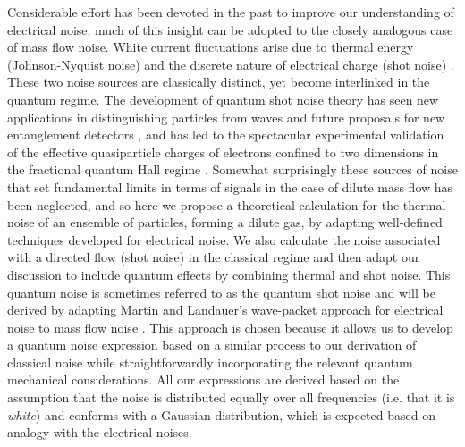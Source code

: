 \documentclass[%
 reprint,
 aps,
 prb,
 epsf,
]{revtex4-2}
\begin{document}
Considerable effort has been devoted in the past to improve our understanding of electrical noise; much of this insight can be adopted to the closely analogous case of mass flow noise.  White current fluctuations arise due to thermal energy (Johnson-Nyquist noise) and the discrete nature of electrical charge (shot noise) \cite{wavepacket}. These two noise sources are classically distinct, yet become interlinked in the quantum regime. The development of quantum shot noise theory has seen new applications in distinguishing particles from waves and future proposals for new entanglement detectors \cite{entanglement}, and has led to the spectacular experimental validation of the effective quasiparticle charges of electrons confined to two dimensions in the fractional quantum Hall regime \cite{quasiparticle,heiblum}. Somewhat surprisingly these sources of noise that set fundamental limits in terms of signals in the case of dilute mass flow has been neglected, and so here we propose a theoretical calculation for the thermal noise of an ensemble of particles, forming a dilute gas, by adapting well-defined techniques developed for electrical noise. We also calculate the noise associated with a directed flow (shot noise) in the classical regime and then adapt our discussion to include quantum effects by combining thermal and shot noise. This quantum noise is sometimes referred to as the quantum shot noise and will be derived by adapting Martin and Landauer's wave-packet approach for electrical noise to mass flow noise \cite{wavepacket}. This approach is chosen because it allows us to develop a quantum noise expression based on a similar process to our derivation of classical noise while straightforwardly incorporating the relevant quantum mechanical considerations.  All our expressions are derived based on the assumption that the noise is distributed equally over all frequencies (i.e. that it is \textit{white}) and conforms with a Gaussian distribution, which is expected based on analogy with the electrical noises.\\
    
\end{document}
